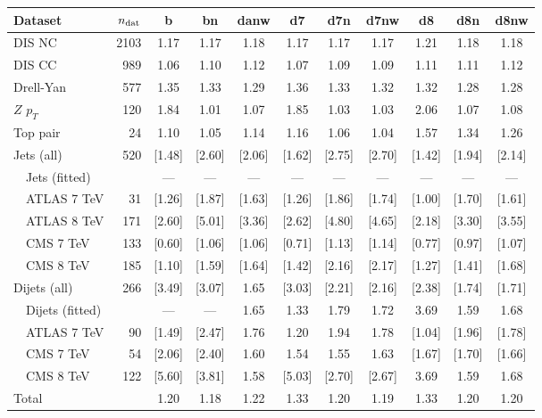 \begin{tabularx}{\textwidth}{Xrccccccccc}
    \toprule
     Dataset                    & $n_{\rm dat}$ &     b  &   bn   &  danw  &    d7  &   d7n  &  d7nw  &    d8  &   d8n  &  d8nw  \\
    \midrule
     DIS NC                     &       2103  &  1.17  &  1.17  &  1.18  &  1.17  &  1.17  &  1.17  &  1.21  &  1.18  &  1.18  \\
     DIS CC                     &        989  &  1.06  &  1.10  &  1.12  &  1.07  &  1.09  &  1.09  &  1.11  &  1.11  &  1.12  \\
     Drell-Yan                  &        577  &  1.35  &  1.33  &  1.29  &  1.36  &  1.33  &  1.32  &  1.32  &  1.28  &  1.28  \\
     $Z$ $p_T$                  &        120  &  1.84  &  1.01  &  1.07  &  1.85  &  1.03  &  1.03  &  2.06  &  1.07  &  1.08  \\
     Top pair                   &         24  &  1.10  &  1.05  &  1.14  &  1.16  &  1.06  &  1.04  &  1.57  &  1.34  &  1.26  \\
     Jets (all)                 &        520  & [1.48] & [2.60] & [2.06] & [1.62] & [2.75] & [2.70] & [1.42] & [1.94] & [2.14] \\
     \ \ Jets (fitted)          &             &  ---   &  ---   &  ---   &  ---   &  ---   &  ---   &  ---   &  ---   &  ---   \\
     \ \ ATLAS 7 TeV            &         31  & [1.26] & [1.87] & [1.63] & [1.26] & [1.86] & [1.74] & [1.00] & [1.70] & [1.61] \\
     \ \ ATLAS 8 TeV            &        171  & [2.60] & [5.01] & [3.36] & [2.62] & [4.80] & [4.65] & [2.18] & [3.30] & [3.55] \\
     \ \ CMS   7 TeV            &        133  & [0.60] & [1.06] & [1.06] & [0.71] & [1.13] & [1.14] & [0.77] & [0.97] & [1.07] \\
     \ \ CMS   8 TeV            &        185  & [1.10] & [1.59] & [1.64] & [1.42] & [2.16] & [2.17] & [1.27] & [1.41] & [1.68] \\
     Dijets (all)               &        266  & [3.49] & [3.07] &  1.65  & [3.03] & [2.21] & [2.16] & [2.38] & [1.74] & [1.71] \\
     \ \ Dijets (fitted)        &             &  ---   &  ---   &  1.65  &  1.33  &  1.79  &  1.72  &  3.69  &  1.59  &  1.68  \\
     \ \ ATLAS 7 TeV            &         90  & [1.49] & [2.47] &  1.76  &  1.20  &  1.94  &  1.78  & [1.04] & [1.96] & [1.78] \\
     \ \ CMS   7 TeV            &         54  & [2.06] & [2.40] &  1.60  &  1.54  &  1.55  &  1.63  & [1.67] & [1.70] & [1.66] \\
     \ \ CMS   8 TeV            &        122  & [5.60] & [3.81] &  1.58  & [5.03] & [2.70] & [2.67] &  3.69  &  1.59  &  1.68  \\
    \midrule
     Total                      &             &  1.20  &  1.18  &  1.22  &  1.33  &  1.20  &  1.19  &  1.33  &  1.20  &  1.20  \\
    \bottomrule
    \end{tabularx}
